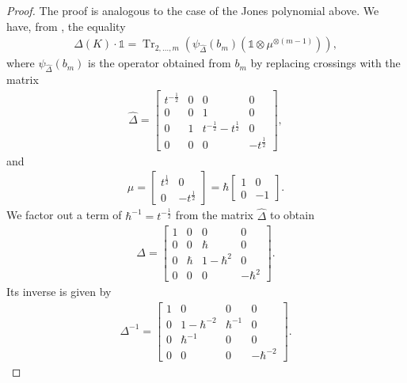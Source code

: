 \documentclass[11pt,fleqn]{amsart} %
\DeclareMathOperator{\tr}{Tr}
\begin{document}
\begin{proof} 
			The proof is analogous to the case of the Jones polynomial above.  We have, from \cite{Ohtsuki}, the equality 
			\begin{eqnarray*}
					\Delta(K)\cdot \mathbb 1 = \tr_{2,\ldots, m}(\psi_{\hat \Delta}(b_m) (\mathbb 1\otimes \mu^{\otimes (m-1)})), 
			\end{eqnarray*}
			where $\psi_{\hat \Delta}(b_m)$ is the operator obtained from $b_m$ by replacing crossings with the matrix 
			\begin{eqnarray*}
				\hat \Delta = \begin{bmatrix}
					t^{-\frac{1}{2}} & 0 & 0 & 0\\
					0 & 0 & 1 & 0\\
					0 & 1 & t^{-\frac{1}{2}}-t^{\frac{1}{2}} & 0\\
					0 & 0 & 0 & -t^{\frac{1}{2}}
				\end{bmatrix}, 
			\end{eqnarray*}
			and 
			\begin{eqnarray*}
					\mu = \begin{bmatrix}
						t^{\frac{1}{2}} & 0\\
						0 & -t^{\frac{1}{2}}
					\end{bmatrix}
					=
				\hbar  \begin{bmatrix}
						1 & 0\\
						0 & -1
					\end{bmatrix}.
			\end{eqnarray*}
			We factor out a term of $\hbar^{-1} = t^{-\frac{1}{2}}$ from the matrix $\hat \Delta$ to obtain
			\begin{eqnarray*}
				\Delta = \begin{bmatrix}
					1 & 0 & 0 & 0\\
					0 & 0 & \hbar & 0\\
					0 & \hbar & 1-\hbar^2 & 0\\
					0 & 0 & 0 & -\hbar^2
				\end{bmatrix}.
			\end{eqnarray*}
							Its inverse is given by 
					\begin{eqnarray*}
						\Delta^{-1} = \begin{bmatrix}
							1 & 0 & 0 & 0\\
							0 & 1-\hbar^{-2} & \hbar^{-1} & 0\\
							0 & \hbar^{-1} & 0 & 0\\
							0 & 0 & 0 & -\hbar^{-2}
						\end{bmatrix}.
					\end{eqnarray*}
			

\end{proof}
\end{document}
